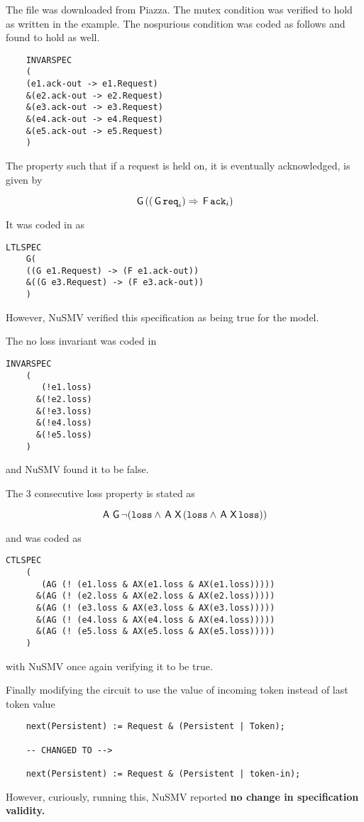 \question

The file was downloaded from Piazza. The mutex condition was verified to hold as
written in the example. The nospurious condition was coded as follows and found
to hold as well.

\begin{lstlisting}
    INVARSPEC
    (
    (e1.ack-out -> e1.Request)
    &(e2.ack-out -> e2.Request)
    &(e3.ack-out -> e3.Request)
    &(e4.ack-out -> e4.Request)
    &(e5.ack-out -> e5.Request)
    )
\end{lstlisting}

The property such that if a request is held on, it is eventually acknowledged, is given by

\begin{equation}
    \,\textsf{G}\, ((\,\textsf{G}\, \texttt{req}_i) \Rightarrow \,\textsf{F}\,\texttt{ack}_i) 
\end{equation}

It was coded in as

\begin{lstlisting}   
LTLSPEC
    G(
    ((G e1.Request) -> (F e1.ack-out))
    &((G e3.Request) -> (F e3.ack-out))
    )
\end{lstlisting}

However, NuSMV verified this specification as being true for the model.

The no loss invariant was coded in 

\begin{lstlisting}
INVARSPEC
    (
       (!e1.loss)
      &(!e2.loss)
      &(!e3.loss)
      &(!e4.loss)
      &(!e5.loss)
    )
\end{lstlisting}

and NuSMV found it to be false.

The 3 consecutive loss property is stated as 

\begin{equation}
    \,\textsf{A}\, \,\textsf{G}\, \lnot (\texttt{loss} \land \,\textsf{A}\,\,\textsf{X}\,(\texttt{loss} \land \,\textsf{A}\,\,\textsf{X}\,\texttt{loss}))
\end{equation}

and was coded as 

\begin{lstlisting}
CTLSPEC
    (
       (AG (! (e1.loss & AX(e1.loss & AX(e1.loss)))))
      &(AG (! (e2.loss & AX(e2.loss & AX(e2.loss)))))
      &(AG (! (e3.loss & AX(e3.loss & AX(e3.loss)))))
      &(AG (! (e4.loss & AX(e4.loss & AX(e4.loss)))))
      &(AG (! (e5.loss & AX(e5.loss & AX(e5.loss)))))
    )
\end{lstlisting}

with NuSMV once again verifying it to be true.

Finally modifying the circuit to use the value of incoming token instead of last
token value

\begin{lstlisting}
    next(Persistent) := Request & (Persistent | Token);

    -- CHANGED TO -->

    next(Persistent) := Request & (Persistent | token-in);
\end{lstlisting}

However, curiously, running this, NuSMV reported \textbf{no change in specification
validity.}
